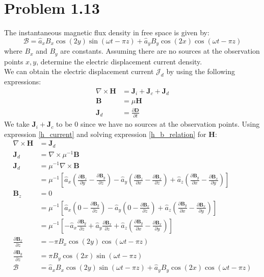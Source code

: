 \documentclass[12pt]{article}
\begin{document}
\section*{Problem 1.13}
The instantaneous magnetic flux density in free space is given by:
\[
{\bm{\mathcal{B}}} = \hat{a}_x B_x \cos(2y) \sin(\omega t - \pi z) + \hat{a}_y B_y \cos(2x) \cos(\omega t - \pi z)
\]
where \( B_x \) and \( B_y \) are constants. Assuming there are no sources at the observation points \( x, y \), determine the electric displacement current density.\\
We can obtain the electric displacement current $\mathcal{J}_d$ by using the following expressions:
\begin{align}
  \nabla \times \bm{H} &= \bm{J}_i +  \bm{J}_c +  \bm{J}_d\label{h_current}\\
  \bm{B} &= \mu \bm{H}\label{h_b_relation}\\
  \bm{J}_d &= \frac{\partial\bm{D}}{\partial t}\label{displacement_curr}
\end{align}
\newpage
\noindent
We take $\bm{J}_i +  \bm{J}_c$ to be 0 since we have no sources at the observation points. Using expression \ref{h_current} and solving expression \ref{h_b_relation} for $\bm{H}$:
\begin{align*}
  \nabla \times \bm{H} &= \bm{J}_d\label{h_current}\\
  \bm{J}_d &= \nabla \times \mu^{-1}\bm{B}\\
  \bm{J}_d &= \mu^{-1}\nabla \times \bm{B}\\
  &= \mu^{-1} \left[\hat a_x\left(\frac{\partial\bm{B}_z}{\partial y} - \frac{\partial\bm{B}_y}{\partial z}\right) - \hat a_y\left( \frac{\partial\bm{B}_z}{\partial x} - \frac{\partial\bm{B}_x}{\partial z}  \right) + \hat a_z\left( \frac{\partial\bm{B}_y}{\partial x} -  \frac{\partial\bm{B}_x}{\partial y}\right)\right]\\
  \bm{B}_z &= 0\\
  &= \mu^{-1}\left[\hat a_x\left(0 - \frac{\partial\bm{B}_y}{\partial z}\right) - \hat a_y\left( 0 - \frac{\partial\bm{B}_x}{\partial z}  \right) + \hat a_z\left( \frac{\partial\bm{B}_y}{\partial x} -  \frac{\partial\bm{B}_x}{\partial y}\right)\right]\\
  &= \mu^{-1}\left[-\hat a_x \frac{\partial\bm{B}_y}{\partial z} + \hat a_y \frac{\partial\bm{B}_x}{\partial z} + \hat a_z\left(\frac{\partial\bm{B}_y}{\partial x} -  \frac{\partial\bm{B}_x}{\partial y}\right)\right]\\
  \frac{\partial\bm{B}_x}{\partial z} & = -\pi B_x \cos(2y) \cos(\omega t - \pi z)\\
  \frac{\partial\bm{B}_y}{\partial z} & = \pi B_y \cos(2x) \sin(\omega t - \pi z)\\
  \bm{\mathcal{B}} &= \hat{a}_x B_x \cos(2y) \sin(\omega t - \pi z) + \hat{a}_y B_y \cos(2x) \cos(\omega t - \pi z)
\end{align*}
\end{document}
